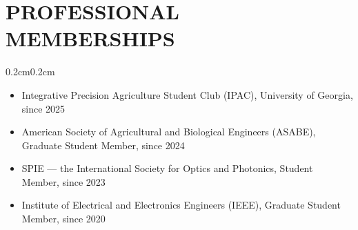 \documentclass[10pt, letterpaper]{article}
\newenvironment{highlights}{%
    \begin{itemize}[topsep=0.08cm, parsep=0.08cm, partopsep=0pt,
                    itemsep=0pt, leftmargin=0.4cm + 10pt]
}{\end{itemize}}
\newenvironment{onecolentry}{%
    \begin{adjustwidth}{0.2cm}{0.2cm}
}{\end{adjustwidth}}
\begin{document}
\section{PROFESSIONAL MEMBERSHIPS}
\vspace{0.08cm}
\begin{onecolentry}
    \begin{highlights}
        \item Integrative Precision Agriculture Student Club (IPAC),
              University of Georgia, since 2025
        \item American Society of Agricultural and Biological Engineers (ASABE),
              Graduate Student Member, since 2024
        \item SPIE --- the International Society for Optics and Photonics,
              Student Member, since 2023
        \item Institute of Electrical and Electronics Engineers (IEEE),
              Graduate Student Member, since 2020
    \end{highlights}
\end{onecolentry}
\vspace{0.18cm}

\end{document}
